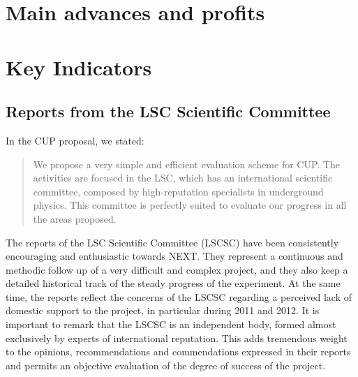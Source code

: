 \documentclass[a4paper,11pt,oneside]{article}
\begin{document}
%
%
%


\section{\bf \textsf{Main advances and profits }}
\label{sec.advances}


\section{\bf \textsf{ Key Indicators}}
\label{sec.indicators}

\subsection*{Reports from the LSC Scientific Committee}

In the CUP proposal, we stated:
\begin{quotation}
We propose a very simple and efficient evaluation scheme for CUP. The  activities are focused in the LSC, which has an international scientific committee, composed by high-reputation specialists in underground physics. This committee is perfectly suited to evaluate our progress in all the areas proposed.
\end{quotation}

The reports of the LSC Scientific Committee (LSCSC) have been consistently encouraging and enthusiastic towards NEXT. They represent a continuous and methodic follow up of a very difficult and complex project, and they
also keep a detailed historical track of the steady progress of the experiment. At the same time, the reports reflect the concerns of the LSCSC regarding a perceived lack of domestic support to the project, in particular during 2011 and 2012.
It is important to remark that the LSCSC is an independent body, formed almost exclusively by experts of international reputation. This adds tremendous weight to the opinions, recommendations and commendations expressed in their reports and permits an objective evaluation of the degree of success of the project. 
\end{document}
